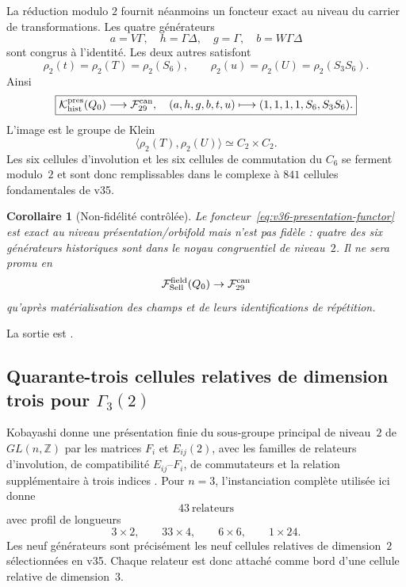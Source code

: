 \documentclass[11pt,a4paper]{article}
\newtheorem{corollary}[theorem]{Corollaire}
\begin{document}
La réduction modulo $2$ fournit néanmoins un foncteur exact au niveau du carrier de transformations. Les quatre générateurs
\[
 a=V\Gamma,\quad h=\Gamma\Delta,\quad g=\Gamma,\quad b=W\Gamma\Delta
\]
sont congrus à l'identité. Les deux autres satisfont
\[
 \rho_2(t)=\rho_2(T)=\rho_2(S_6),
 \qquad
 \rho_2(u)=\rho_2(U)=\rho_2(S_3S_6).
\]
Ainsi
\begin{equation}\label{eq:v36-presentation-functor}
\boxed{
\mathcal K_{\rm hist}^{\rm pres}(Q_0)
\longrightarrow
\mathcal F_{29}^{\rm can},
\quad
(a,h,g,b,t,u)\longmapsto
(1,1,1,1,S_6,S_3S_6).
}
\end{equation}
L'image est le groupe de Klein
\[
\langle\rho_2(T),\rho_2(U)\rangle\simeq C_2\times C_2.
\]
Les six cellules d'involution et les six cellules de commutation du $C_6$ se ferment modulo~$2$ et sont donc remplissables dans le complexe à $841$ cellules fondamentales de v35.

\begin{corollary}[Non-fidélité contrôlée]\label{cor:v36-functor-not-faithful}
Le foncteur~\eqref{eq:v36-presentation-functor} est exact au niveau présentation/orbifold mais n'est pas fidèle : quatre des six générateurs historiques sont dans le noyau congruentiel de niveau~$2$. Il ne sera promu en
\[
\mathcal F_{\rm Sell}^{\rm field}(Q_0)\to\mathcal F_{29}^{\rm can}
\]
qu'après matérialisation des champs et de leurs identifications de répétition.
\end{corollary}

La sortie est .

\subsection{Quarante-trois cellules relatives de dimension trois pour $\Gamma_3(2)$}

Kobayashi donne une présentation finie du sous-groupe principal de niveau~$2$ de $GL(n,\mathbb Z)$ par les matrices $F_i$ et $E_{ij}(2)$, avec les familles de relateurs d'involution, de compatibilité $E_{ij}$--$F_i$, de commutateurs et la relation supplémentaire à trois indices \cite{Kobayashi2015}. Pour $n=3$, l'instanciation complète utilisée ici donne
\[
\boxed{43\ \text{relateurs}}
\]
avec profil de longueurs
\[
\boxed{3\times2,\qquad33\times4,\qquad6\times6,\qquad1\times24.}
\]
Les neuf générateurs sont précisément les neuf cellules relatives de dimension~$2$ sélectionnées en v35. Chaque relateur est donc attaché comme bord d'une cellule relative de dimension~$3$.
\end{document}
